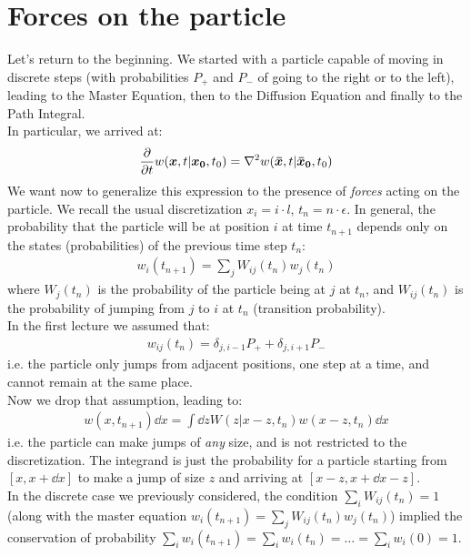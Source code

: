 \documentclass[../template.tex]{subfiles}
\begin{document}
\section{Forces on the particle}
Let's return to the beginning. We started with a particle capable of moving in discrete steps (with probabilities $P_+$ and $P_-$ of going to the right or to the left), leading to the Master Equation, then to the Diffusion Equation and finally to the Path Integral.\\
In particular, we arrived at:
\begin{align*}
    \pdv{t} w(\bm{x}, t | \bm{x_0}, t_0) = \nabla^2 w(\bm{\bar{x}}, t| \bm{\bar{x}_0}, t_0)
\end{align*}
We want now to generalize this expression to the presence of \textit{forces} acting on the particle. We recall the usual discretization $x_i = i \cdot l$, $t_n = n \cdot \epsilon$. In general, the probability that the particle will be at position $i$ at time $t_{n+1}$ depends only on the states (probabilities) of the previous time step $t_n$:
\begin{align*}
    w_{i}(t_{n+1}) = \sum_j W_{ij}(t_n) w_j(t_n)
\end{align*}     
where $W_j(t_n)$ is the probability of the particle being at $j$ at $t_n$, and $W_{ij}(t_n)$ is the probability of jumping from $j$ to $i$ at $t_n$ (transition probability).\\
In the first lecture we assumed that:
\begin{align*}
    w_{ij}(t_n) = \delta_{j,i-1} P_+ + \delta_{j,i+1} P_-
\end{align*}        
i.e. the particle only jumps from adjacent positions, one step at a time, and cannot remain at the same place.\\
Now we drop that assumption, leading to:
\begin{align*}
    w(x, t_{n+1})\dd{x} = \int \dd{z} W(z | x-z, t_n) w(x-z, t_n) \dd{x}
\end{align*}
i.e. the particle can make jumps of \textit{any} size, and is not restricted to the discretization. The integrand is just the probability for a particle starting from $[x,x+\dd{x}]$ to make a jump of size $z$ and arriving at $[x-z, x+\dd{x}-z]$.\\
In the discrete case we previously considered, the condition $\sum_i W_{ij} (t_n) = 1$ (along with the master equation $w_i(t_{n+1}) = \sum_j W_{ij} (t_n) w_j(t_n)$) implied the conservation of probability $\sum_i w_i(t_{n+1}) = \sum_i w_i(t_n) = \dots = \sum_i w_i(0) = 1$.\\
\end{document}
